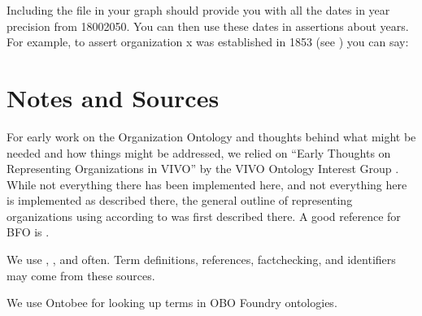 \documentclass[letterpaper,10pt,english]{sphinxmanual}
\begin{document}
\sphinxAtStartPar
Including the file  in your graph should provide you with all the
dates in year precision from 1800\sphinxhyphen{}2050.  You can then use these dates in
assertions about years.  For example, to assert organization x was
established in 1853 (see {\hyperref[\detokenize{datetimes::doc}]{}}) you can say:

\begin{sphinxVerbatim}[commandchars=\\\{\}]
  
  
  
  
  
\end{sphinxVerbatim}


\chapter{Notes and Sources}
\label{\detokenize{notes-and-sources:notes-and-sources}}\label{\detokenize{notes-and-sources::doc}}
\sphinxAtStartPar
For early work on the Organization Ontology and thoughts behind what might be needed
and how things might be addressed, we relied on “Early Thoughts on Representing
Organizations in VIVO” by the VIVO Ontology Interest Group .  While not
everything there
has been implemented here, and not everything here is implemented as described there,
the general outline of representing organizations using  according to  was
first described there. A good reference for BFO is .

\sphinxAtStartPar
We use , , and  often.  Term definitions,
references, fact\sphinxhyphen{}checking, and identifiers may come from these sources.

\sphinxAtStartPar
We use Ontobee  for looking up terms in OBO Foundry ontologies.
\end{document}
